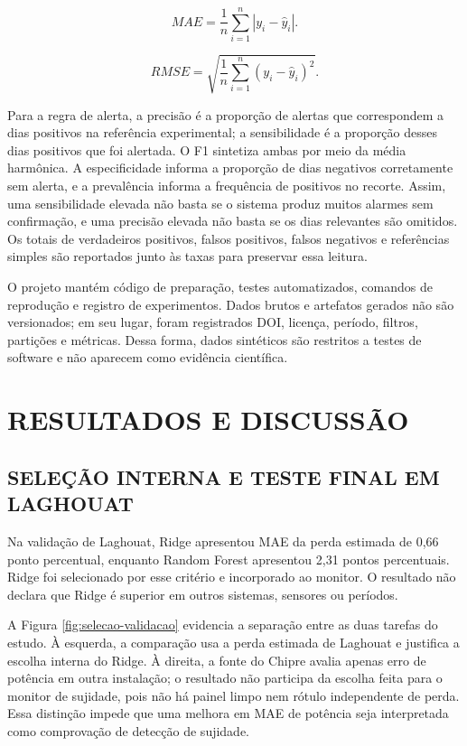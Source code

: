 \documentclass{UNESC}
\begin{document}
\begin{equation}
MAE=\frac{1}{n}\sum_{i=1}^{n}\left|y_i-\hat{y}_i\right|.
\label{eq:mae}
\end{equation}

\begin{equation}
RMSE=\sqrt{\frac{1}{n}\sum_{i=1}^{n}\left(y_i-\hat{y}_i\right)^2}.
\label{eq:rmse}
\end{equation}

Para a regra de alerta, a precisão é a proporção de alertas que correspondem a dias positivos na referência experimental; a sensibilidade é a proporção desses dias positivos que foi alertada. O F1 sintetiza ambas por meio da média harmônica. A especificidade informa a proporção de dias negativos corretamente sem alerta, e a prevalência informa a frequência de positivos no recorte. Assim, uma sensibilidade elevada não basta se o sistema produz muitos alarmes sem confirmação, e uma precisão elevada não basta se os dias relevantes são omitidos. Os totais de verdadeiros positivos, falsos positivos, falsos negativos e referências simples são reportados junto às taxas para preservar essa leitura.

O projeto mantém código de preparação, testes automatizados, comandos de reprodução e registro de experimentos. Dados brutos e artefatos gerados não são versionados; em seu lugar, foram registrados DOI, licença, período, filtros, partições e métricas. Dessa forma, dados sintéticos são restritos a testes de software e não aparecem como evidência científica.

\section{RESULTADOS E DISCUSSÃO}

\subsection{SELEÇÃO INTERNA E TESTE FINAL EM LAGHOUAT}

Na validação de Laghouat, Ridge apresentou MAE da perda estimada de 0,66 ponto percentual, enquanto Random Forest apresentou 2,31 pontos percentuais. Ridge foi selecionado por esse critério e incorporado ao monitor. O resultado não declara que Ridge é superior em outros sistemas, sensores ou períodos.

A Figura \ref{fig:selecao-validacao} evidencia a separação entre as duas tarefas do estudo. À esquerda, a comparação usa a perda estimada de Laghouat e justifica a escolha interna do Ridge. À direita, a fonte do Chipre avalia apenas erro de potência em outra instalação; o resultado não participa da escolha feita para o monitor de sujidade, pois não há painel limpo nem rótulo independente de perda. Essa distinção impede que uma melhora em MAE de potência seja interpretada como comprovação de detecção de sujidade.
\end{document}

